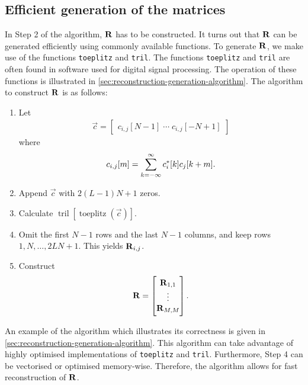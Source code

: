 \documentclass[a4paper, openany, oneside]{memoir}
\begin{document}
\subsection{Efficient generation of the matrices}
\label{sub:reconstruction-generation}
In Step 2 of the algorithm, $\boldsymbol{\mathbf{R}}$ has to be constructed. It turns out that $\boldsymbol{\mathbf{R}}$ can be generated efficiently using commonly available functions. To generate $\boldsymbol{\mathbf{R}}$, we make use of the functions \texttt{toeplitz} and \texttt{tril}. The functions \texttt{toeplitz} and \texttt{tril} are often found in software used for digital signal processing. The operation of these functions is illustrated in \cref{sec:reconstruction-generation-algorithm}. The algorithm to construct $\boldsymbol{\mathbf{R}}$ is as follows:

\begin{enumerate}[labelindent=0pt,labelwidth=\widthof{\ref{last-item2}},label=\textbf{Step \arabic*:},itemindent=1em,leftmargin=!]
    \item Let \begin{align*}
                \vec{c} = \begin{bmatrix} c_{i,j}[N-1] \; \cdots \; c_{i,j}[-N+1] \end{bmatrix}
\end{align*} where \begin{align*}
                c_{i,j}[m] = \sum_{k=-\infty}^{\infty}c^*_i[k] c_j[k+m].
            \end{align*}
    \item Append $\vec{c}$ with $2(L-1)N+1$ zeros.
    \item Calculate $\operatorname{tril}[\operatorname{toeplitz}(\vec{c})]$.
    \item Omit the first $N-1$ rows and the last $N-1$ columns, and keep rows $1,N,\ldots,2LN+1$. This yields $\boldsymbol{\mathbf{R}}_{i,j}$.
    \item Construct \begin{align*}
        \boldsymbol{\mathbf{R}} = \begin{bmatrix}
            \boldsymbol{\mathbf{R}}_{1,1} \\ \vdots \\ \boldsymbol{\mathbf{R}}_{M,M}
        \end{bmatrix}.
    \end{align*}
    \label{last-item2}
\end{enumerate}

An example of the algorithm which illustrates its correctness is given in \cref{sec:reconstruction-generation-algorithm}. This algorithm can take advantage of highly optimised implementations of \texttt{toeplitz} and \texttt{tril}. Furthermore, Step 4 can be vectorised or optimised memory-wise. Therefore, the algorithm allows for fast reconstruction of $\boldsymbol{\mathbf{R}}$.
\end{document}
